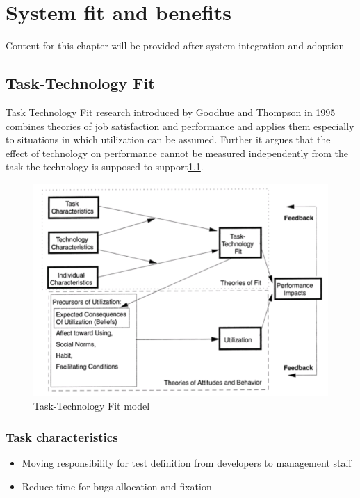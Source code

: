 \chapter{System fit and benefits}
\label{chap:performance}


Content for this chapter will be provided after system integration and adoption
\section{Task-Technology Fit}
Task Technology Fit research introduced by Goodhue and Thompson in 1995 \cite{MES10} combines theories of job satisfaction and performance and applies them especially to situations in which utilization can be assumed. Further it argues that the effect of technology on performance cannot be measured independently from the task the technology is supposed to support\ref{fig:ttf}.
\begin{figure}[ht]
	\label{fig:ttf}
	\centering
	\includegraphics[width=\textwidth]{grafiken/ttf.png}
	\caption{Task-Technology Fit model\cite{MES10}}
\end{figure}

\subsection{Task characteristics}
\begin{itemize}
	\item Moving responsibility for test definition from developers to management staff
	\item Reduce time for bugs allocation and fixation
\end{itemize}


